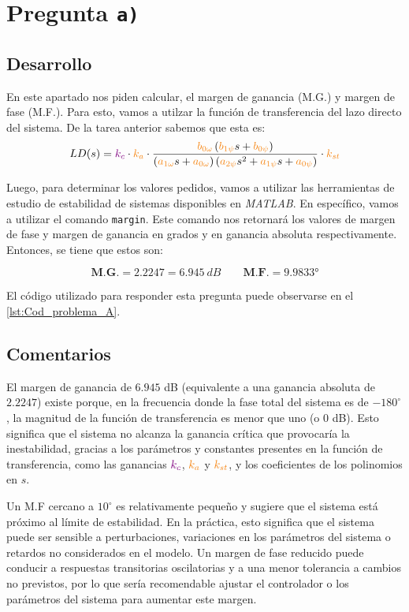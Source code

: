 \section{Pregunta \texttt{a)}}\label{pregunta-a}

\subsection{Desarrollo}

En este apartado nos piden calcular, el margen de ganancia (M.G.) y margen de fase
(M.F.). Para esto, vamos a utilzar la función de transferencia del lazo directo del
sistema. De la tarea anterior \cite{tarea-2-sdc} sabemos que esta es:
\begin{equation}
  LD(s) = \mora{k_c} \cdot \nara{k_a} \cdot \frac{\nara{b_{0\omega}} \left(\nara{b_{1\psi}}s + \nara{b_{0\psi}}\right)}
  {\left(\nara{a_{1\omega}}s + \nara{a_{0\omega}}\right)\left(\nara{a_{2\psi}}s^2 + \nara{a_{1\psi}}s + \nara{a_{0\psi}}\right)} \cdot \nara{k_{st}}
\end{equation}

Luego, para determinar los valores pedidos, vamos a utilizar las herramientas
de estudio de estabilidad de sistemas disponibles en \textit{MATLAB}. En
específico, vamos a utilizar el comando \texttt{margin}. Este comando nos
retornará los valores de margen de fase y margen de ganancia en grados y en
ganancia absoluta respectivamente. Entonces, se tiene que estos son:

\begin{equation}
  \boxed{\textbf{M.G.} = 2.2247 = 6.945\ \unit{dB}} \qquad \boxed{\textbf{M.F.} = \ang{9.9833}}
\end{equation}

El código utilizado para responder esta pregunta puede observarse en el
\autoref{lst:Cod_problema_A}.

\subsection{Comentarios}

El margen de ganancia de $6.945$ dB (equivalente a una ganancia absoluta de $2.2247$) existe porque, en la frecuencia donde la fase total del sistema es de $-180^\circ$, la magnitud de la función de transferencia es menor que uno (o $0$ dB). Esto significa que el sistema no alcanza la ganancia crítica que provocaría la inestabilidad, gracias a los parámetros y constantes presentes en la función de transferencia, como las ganancias $\mathbin{\color{violet}k_c}$, $\nara{k_a}$ y $\nara{k_{st}}$, y los coeficientes de los polinomios en $s$.

Un M.F cercano a $10^\circ$ es relativamente pequeño y sugiere que el sistema está próximo al límite de estabilidad. En la práctica, esto significa que el sistema puede ser sensible a perturbaciones, variaciones en los parámetros del sistema o retardos no considerados en el modelo. Un margen de fase reducido puede conducir a respuestas transitorias oscilatorias y a una menor tolerancia a cambios no previstos, por lo que sería recomendable ajustar el controlador o los parámetros del sistema para aumentar este margen.



